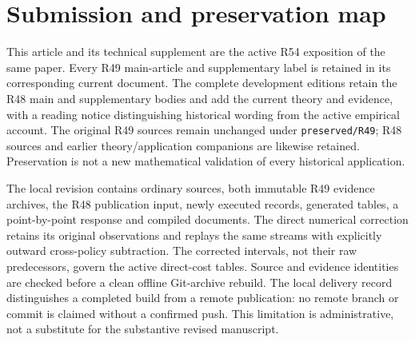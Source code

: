 \documentclass[ecta,nameyear,draft]{econsocart}
\begin{document}
\section{Submission and preservation map}\label{sec:map49}
This article and its technical supplement are the active R54 exposition of the same paper. Every R49 main-article and supplementary label is retained in its corresponding current document. The complete development editions retain the R48 main and supplementary bodies and add the current theory and evidence, with a reading notice distinguishing historical wording from the active empirical account. The original R49 sources remain unchanged under \texttt{preserved/R49}; R48 sources and earlier theory/application companions are likewise retained. Preservation is not a new mathematical validation of every historical application.

The local revision contains ordinary sources, both immutable R49 evidence archives, the R48 publication input, newly executed records, generated tables, a point-by-point response and compiled documents. The direct numerical correction retains its original observations and replays the same streams with explicitly outward cross-policy subtraction. The corrected intervals, not their raw predecessors, govern the active direct-cost tables. Source and evidence identities are checked before a clean offline Git-archive rebuild. The local delivery record distinguishes a completed build from a remote publication: no remote branch or commit is claimed without a confirmed push. This limitation is administrative, not a substitute for the substantive revised manuscript.




\end{document}
